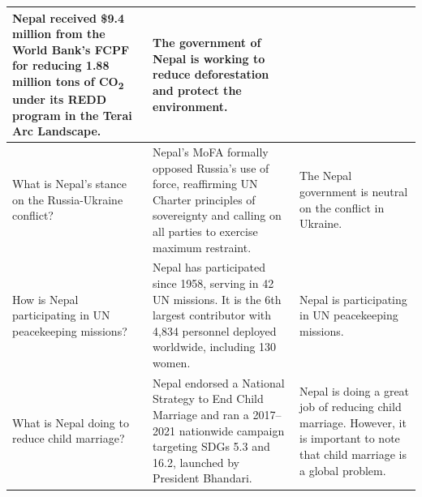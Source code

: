 \begin{table}[H]
\begin{tabular}{|p{3.5cm}|p{5.5cm}|p{5.5cm}|}
Nepal received \$9.4 million from the World Bank's FCPF for reducing 1.88 million tons of CO\textsubscript{2} under its REDD program in the Terai Arc Landscape. &
The government of Nepal is working to reduce deforestation and protect the environment. \\
\hline
What is Nepal's stance on the Russia-Ukraine conflict? &
Nepal's MoFA formally opposed Russia's use of force, reaffirming UN Charter principles of sovereignty and calling on all parties to exercise maximum restraint. &
The Nepal government is neutral on the conflict in Ukraine. \\
\hline
How is Nepal participating in UN peacekeeping missions? &
Nepal has participated since 1958, serving in 42 UN missions. It is the 6th largest contributor with 4,834 personnel deployed worldwide, including 130 women. &
Nepal is participating in UN peacekeeping missions. \\
\hline
What is Nepal doing to reduce child marriage? &
Nepal endorsed a National Strategy to End Child Marriage and ran a 2017--2021 nationwide campaign targeting SDGs 5.3 and 16.2, launched by President Bhandari. &
Nepal is doing a great job of reducing child marriage. However, it is important to note that child marriage is a global problem. \\
\hline
\end{tabular}
\end{table}